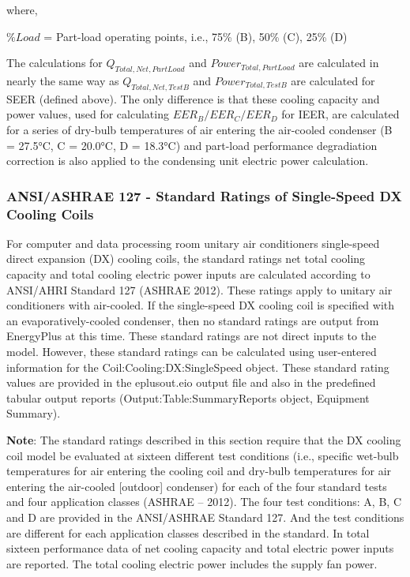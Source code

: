 where,

\(\% Load\) = Part-load operating points, i.e., 75\% (B), 50\% (C), 25\% (D)

The calculations for \(Q_{Total,Net,PartLoad}\) and \(Power_{Total,PartLoad}\) are calculated in nearly the same way as \(Q_{Total,Net,TestB}\) and \(Power_{Total,TestB}\) are calculated for SEER (defined above). The only difference is that these cooling capacity and power values, used for calculating \(EER_{B} / EER_{C} / EER_{D}\) for IEER, are calculated for a series of dry-bulb temperatures of air entering the air-cooled condenser (B = 27.5°C, C = 20.0°C, D = 18.3°C) and part-load performance degradiation correction is also applied to the condensing unit electric power calculation.

\subsubsection{ANSI/ASHRAE 127 - Standard Ratings of Single-Speed DX Cooling Coils}\label{ansiashrae-127---standard-ratings-of-single-speed-dx-cooling-coils}

For computer and data processing room unitary air conditioners single-speed direct expansion (DX) cooling coils, the standard ratings net total cooling capacity and total cooling electric power inputs are calculated according to ANSI/AHRI Standard 127 (ASHRAE 2012). These ratings apply to unitary air conditioners with air-cooled. If the single-speed DX cooling coil is specified with an evaporatively-cooled condenser, then no standard ratings are output from EnergyPlus at this time. These standard ratings are not direct inputs to the model. However, these standard ratings can be calculated using user-entered information for the Coil:Cooling:DX:SingleSpeed object. These standard rating values are provided in the eplusout.eio output file and also in the predefined tabular output reports (Output:Table:SummaryReports object, Equipment Summary).

\textbf{Note}: The standard ratings described in this section require that the DX cooling coil model be evaluated at sixteen different test conditions (i.e., specific wet-bulb temperatures for air entering the cooling coil and dry-bulb temperatures for air entering the air-cooled {[}outdoor{]} condenser) for each of the four standard tests and four application classes (ASHRAE -- 2012). The four test conditions: A, B, C and D are provided in the ANSI/ASHRAE Standard 127. And the test conditions are different for each application classes described in the standard. In total sixteen performance data of net cooling capacity and total electric power inputs are reported. The total cooling electric power includes the supply fan power.

